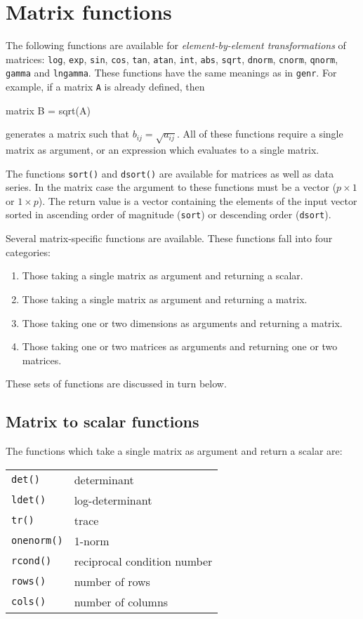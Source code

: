 \section{Matrix functions}
\label{matrix-func}

The following functions are available for \textit{element-by-element
  transformations} of matrices: \texttt{log}, \texttt{exp},
\texttt{sin}, \texttt{cos}, \texttt{tan}, \texttt{atan}, \texttt{int},
\texttt{abs}, \texttt{sqrt}, \texttt{dnorm}, \texttt{cnorm},
\texttt{qnorm}, \texttt{gamma} and \texttt{lngamma}.  These functions
have the same meanings as in \texttt{genr}.  For example, if a matrix
\texttt{A} is already defined, then
%
\begin{code}
matrix B = sqrt(A)
\end{code}
%
generates a matrix such that $b_{ij} = \sqrt{a_{ij}}$.  All of these
functions require a single matrix as argument, or an expression which
evaluates to a single matrix.

The functions \texttt{sort()} and \texttt{dsort()} are available for
matrices as well as data series.  In the matrix case the argument to
these functions must be a vector ($p \times 1$ or $1\times p$).  The
return value is a vector containing the elements of the input vector
sorted in ascending order of magnitude (\texttt{sort}) or descending
order (\texttt{dsort}).

Several matrix-specific functions are available.  These functions fall
into four categories:
%
\begin{enumerate}
\item Those taking a single matrix as argument and returning a scalar.
\item Those taking a single matrix as argument and returning a matrix.
\item Those taking one or two dimensions as arguments and
  returning a matrix.
\item Those taking one or two matrices as arguments and returning one
  or two matrices.
\end{enumerate}
%
These sets of functions are discussed in turn below.

\subsection{Matrix to scalar functions}
\label{matrix-to-scalar}

The functions which take a single matrix as argument and return a
scalar are:

\begin{center}
\begin{tabular}{ll}
\texttt{det()} & determinant \\
\texttt{ldet()} & log-determinant \\
\texttt{tr()} & trace \\
\texttt{onenorm()} & 1-norm \\
\texttt{rcond()} & reciprocal condition number \\
\texttt{rows()} & number of rows \\
\texttt{cols()} & number of columns 
\end{tabular}
\end{center}

